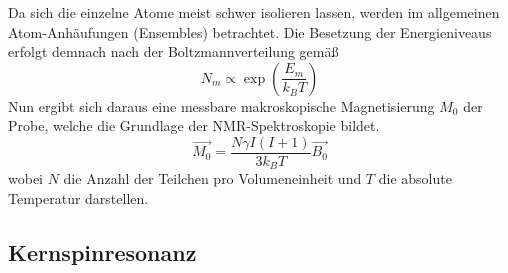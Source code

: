 Da sich die einzelne Atome meist schwer isolieren lassen, werden im allgemeinen Atom-Anhäufungen (Ensembles)
betrachtet. Die Besetzung der Energieniveaus erfolgt demnach nach der Boltzmannverteilung gemäß
\begin{equation}
    N_m \propto \exp\left(\frac{E_m}{k_BT}\right)
\end{equation}
Nun ergibt sich daraus eine messbare makroskopische Magnetisierung $M_0$ der Probe, welche die Grundlage der NMR-Spektroskopie bildet.
\begin{equation}
    \vec{M_0}=\frac{N\gamma I(I+1)}{3k_BT}\vec{B_0}
\end{equation}
wobei $N$ die Anzahl der Teilchen pro Volumeneinheit und $T$ die absolute Temperatur darstellen.
\subsection*{Kernspinresonanz}
